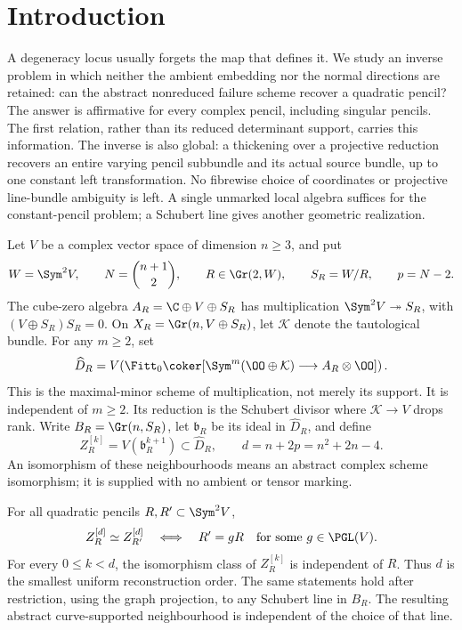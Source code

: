 \section{Introduction}
\label{sec:introduction-v132}

A degeneracy locus usually forgets the map that defines it.  We study
an inverse problem in which neither the ambient embedding nor the
normal directions are retained: can the abstract nonreduced failure
scheme recover a quadratic pencil?  The answer is affirmative for
every complex pencil, including singular pencils.  The first relation, rather than its reduced determinant support,
carries this information.  The inverse is also global: a thickening over a projective reduction
recovers an entire varying pencil subbundle and its actual source
bundle, up to one constant left transformation.  No fibrewise choice
of coordinates or projective line-bundle ambiguity is left.  A
single unmarked local algebra suffices for the constant-pencil
problem; a Schubert line gives another geometric realization.

Let \(V\) be a complex vector space of dimension \(n\ge3\), and put
\[
 W=\Sym^2V,\qquad N=\binom{n+1}{2},\qquad
 R\in\Gr(2,W),\qquad S_R=W/R,\qquad p=N-2.
\]
The cube-zero algebra \(A_R=\C\oplus V\oplus S_R\) has multiplication
\(\Sym^2V\twoheadrightarrow S_R\), with
\((V\oplus S_R)S_R=0\).  On \(X_R=\Gr(n,V\oplus S_R)\), let
\(\mathcal K\) denote the tautological bundle.  For any \(m\ge2\), set
\begin{equation}\label{eq:failure-intro}
 \widehat D_R=V\!\left(\Fitt_0\coker[
 \Sym^m(\OO\oplus\mathcal K)\longrightarrow A_R\otimes\OO]\right).
\end{equation}
This is the maximal-minor scheme of multiplication, not merely its
support.  It is independent of \(m\ge2\).  Its reduction is the
Schubert divisor where \(\mathcal K\to V\) drops rank.  Write
\(B_R=\Gr(n,S_R)\), let \(\mathfrak b_R\) be its ideal in
\(\widehat D_R\), and define
\[
 Z_R^{[k]}=V(\mathfrak b_R^{k+1})\subset\widehat D_R,
       \qquad d=n+2p=n^2+2n-4.
\]
An isomorphism of these neighbourhoods means an abstract complex
scheme isomorphism; it is supplied with no ambient or tensor marking.

\begin{theorem}
\label{thm:principal-finite-v143}
For all quadratic pencils \(R,R'\subset\Sym^2V\),
\[
 Z_R^{[d]}\simeq Z_{R'}^{[d]}
       \quad\Longleftrightarrow\quad
 R'=gR\quad\text{for some }g\in\PGL(V).
\]
For every \(0\le k<d\), the isomorphism class of \(Z_R^{[k]}\)
is independent of \(R\).  Thus \(d\) is the smallest uniform
reconstruction order.  The same statements hold after restriction,
using the graph projection, to any Schubert line in \(B_R\).
The resulting abstract curve-supported neighbourhood is independent
of the choice of that line.
\end{theorem}


